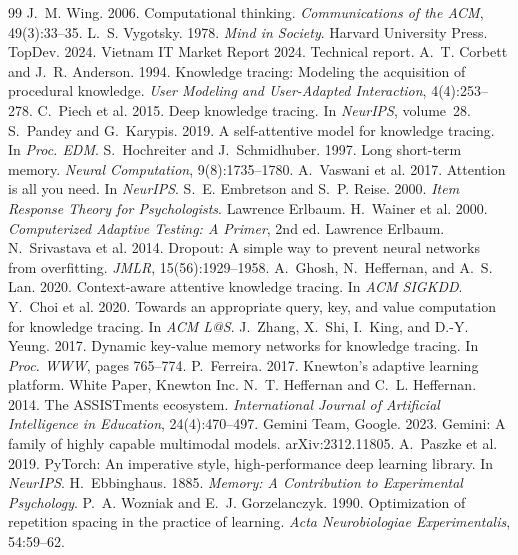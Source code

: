 \documentclass[11pt]{article}
\begin{document}
\begin{thebibliography}{99}
 J.~M. Wing. 2006. Computational thinking. \textit{Communications of the ACM}, 49(3):33--35.
 L.~S. Vygotsky. 1978. \textit{Mind in Society}. Harvard University Press.
 TopDev. 2024. Vietnam IT Market Report 2024. Technical report.
 A.~T. Corbett and J.~R. Anderson. 1994. Knowledge tracing: Modeling the acquisition of procedural knowledge. \textit{User Modeling and User-Adapted Interaction}, 4(4):253--278.
 C.~Piech et al. 2015. Deep knowledge tracing. In \textit{NeurIPS}, volume~28.
 S.~Pandey and G.~Karypis. 2019. A self-attentive model for knowledge tracing. In \textit{Proc. EDM}.
 S.~Hochreiter and J.~Schmidhuber. 1997. Long short-term memory. \textit{Neural Computation}, 9(8):1735--1780.
 A.~Vaswani et al. 2017. Attention is all you need. In \textit{NeurIPS}.
 S.~E. Embretson and S.~P. Reise. 2000. \textit{Item Response Theory for Psychologists}. Lawrence Erlbaum.
 H.~Wainer et al. 2000. \textit{Computerized Adaptive Testing: A Primer}, 2nd ed. Lawrence Erlbaum.
 N.~Srivastava et al. 2014. Dropout: A simple way to prevent neural networks from overfitting. \textit{JMLR}, 15(56):1929--1958.
 A.~Ghosh, N.~Heffernan, and A.~S. Lan. 2020. Context-aware attentive knowledge tracing. In \textit{ACM SIGKDD}.
 Y.~Choi et al. 2020. Towards an appropriate query, key, and value computation for knowledge tracing. In \textit{ACM L@S}.
 J.~Zhang, X.~Shi, I.~King, and D.-Y. Yeung. 2017. Dynamic key-value memory networks for knowledge tracing. In \textit{Proc. WWW}, pages 765--774.
 P.~Ferreira. 2017. Knewton's adaptive learning platform. White Paper, Knewton Inc.
 N.~T. Heffernan and C.~L. Heffernan. 2014. The ASSISTments ecosystem. \textit{International Journal of Artificial Intelligence in Education}, 24(4):470--497.
 Gemini Team, Google. 2023. Gemini: A family of highly capable multimodal models. arXiv:2312.11805.
 A.~Paszke et al. 2019. PyTorch: An imperative style, high-performance deep learning library. In \textit{NeurIPS}.
 H.~Ebbinghaus. 1885. \textit{Memory: A Contribution to Experimental Psychology}.
 P.~A. Wozniak and E.~J. Gorzelanczyk. 1990. Optimization of repetition spacing in the practice of learning. \textit{Acta Neurobiologiae Experimentalis}, 54:59--62.
\end{thebibliography}
\end{document}
